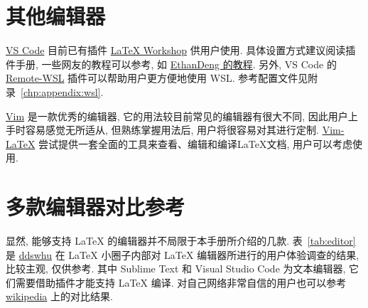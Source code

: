 \section{其他编辑器}

\href{https://code.visualstudio.com/}{VS Code} 目前已有插件
\href{https://marketplace.visualstudio.com/items?itemName=James-Yu.latex-workshop}{LaTeX Workshop}
供用户使用.
具体设置方式建议阅读插件手册,
一些网友的教程可以参考,
如
\href{https://github.com/EthanDeng/vscode-latex}{EthanDeng 的教程}.
另外,
VS Code 的
\href{https://marketplace.visualstudio.com/items?itemName=ms-vscode-remote.remote-wsl}{Remote-WSL}
插件可以帮助用户更方便地使用 WSL.
参考配置文件见附录~\ref{chp:appendix:wsl}.

\href{https://www.vim.org/}{Vim} 是一款优秀的编辑器,
它的用法较目前常见的编辑器有很大不同,
因此用户上手时容易感觉无所适从,
但熟练掌握用法后,
用户将很容易对其进行定制.
\href{http://vim-latex.sourceforge.net/}{Vim-LaTeX}
尝试提供一套全面的工具来查看、编辑和编译LaTeX文档,
用户可以考虑使用.

\section{多款编辑器对比参考}

显然, 能够支持 \LaTeX{} 的编辑器并不局限于本手册所介绍的几款.
表~\ref{tab:editor} 是 \href{https://ddswhu.me/}{ddswhu} 在 \LaTeX{}
小圈子内部对 \LaTeX{} 编辑器所进行的用户体验调查的结果, 比较主观, 仅供参考.
其中 Sublime Text 和 Visual Studio Code 为文本编辑器,
它们需要借助插件才能支持 \LaTeX{} 编译.
对自己网络非常自信的用户也可以参考
\href{https://en.wikipedia.org/wiki/Comparison_of_TeX_editors}{wikipedia}
上的对比结果.

